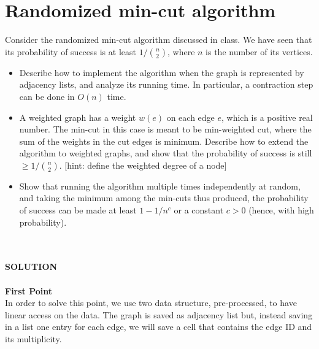 \documentclass[a4paper]{article}
\begin{document}
\section*{Randomized min-cut algorithm}
Consider the randomized min-cut algorithm discussed in class.
We have seen that its probability of success is at least $1 / \binom{n}{2}$, where $n$ is the number of its vertices.
\begin{itemize}
\item Describe how to implement the algorithm when the graph is represented by adjacency lists, and analyze its running time.
In particular, a contraction step can be done in $O(n)$ time.
\item A weighted graph has a weight $w(e)$ on each edge $e$, which  is  a  positive  real number.
The  min-cut  in  this  case  is  meant  to  be  min-weighted  cut,  where  the sum  of  the  weights  in  the  cut  edges  is  minimum.
Describe  how  to  extend  the algorithm  to  weighted  graphs,  and  show  that  the  probability  of  success  is  still $\geq 1/\binom{n}{2}$. [hint: define the weighted degree of a node]
\item Show that running the algorithm multiple times independently at random, and taking the minimum among the min-cuts thus produced, the probability of success can be made at least $1 - 1/n^c$ or a constant $c > 0$ (hence, with high probability).
\end{itemize}
\
\\
\\
\textbf{SOLUTION}
\\
\\

\noindent
\textbf{First Point}
\\
In order to solve this point, we use two data structure, pre-processed, to have linear access on the data. The graph is saved as adjacency list but, instead saving in a list one entry for each edge, we will save a cell that contains the edge ID and its multiplicity. 

\end{document}
